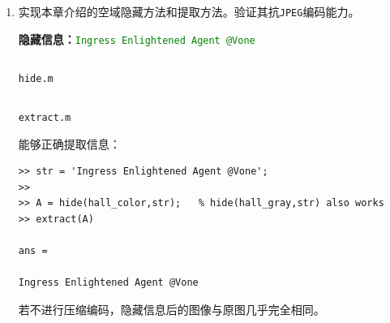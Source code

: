 \documentclass{article}
\numberwithin{figure}{section}
\numberwithin{table}{section}
\numberwithin{listing}{section}
\numberwithin{equation}{section}
\begin{document}
        \begin{enumerate}
            \item 实现本章介绍的空域隐藏方法和提取方法。验证其抗\texttt{JPEG}编码能力。

                \textbf{隐藏信息：}\textcolor{green}{\texttt{Ingress Enlightened Agent @Vone}}

                \begin{listing}[H]
                    \inputminted{matlab}{../hide.m}
                    \caption{\texttt{hide.m}}
                \end{listing}

                \begin{listing}[H]
                    \inputminted{matlab}{../extract.m}
                    \caption{\texttt{extract.m}}
                \end{listing}

                能够正确提取信息：

                \begin{verbatim}
>> str = 'Ingress Enlightened Agent @Vone';
>> 
>> A = hide(hall_color,str);   % hide(hall_gray,str) also works
>> extract(A)

ans =

Ingress Enlightened Agent @Vone 
                \end{verbatim}

                若不进行压缩编码，隐藏信息后的图像与原图几乎完全相同。


\end{enumerate}
\end{document}

